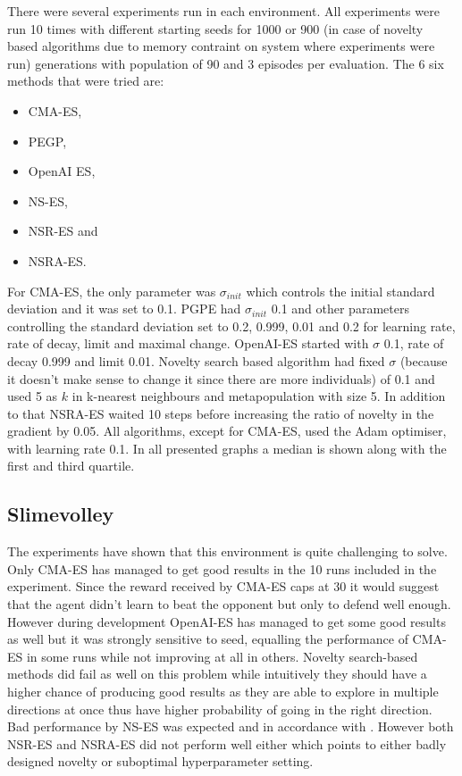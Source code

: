 There were several experiments run in each environment. All experiments were run 10 times with different starting seeds for 1000 or 900 (in case of novelty based algorithms due to memory contraint on system where experiments were run) generations with population of 90 and 3 episodes per evaluation. The 6 six methods that were tried are:
\begin{itemize}
    \item CMA-ES, 
    \item PEGP,
    \item OpenAI ES,
    \item NS-ES, 
    \item NSR-ES and
    \item NSRA-ES.
\end{itemize}

For CMA-ES, the only parameter was $\sigma_{init}$ which controls the initial standard deviation and it was set to 0.1. PGPE had $\sigma_{init}$ 0.1 and other parameters controlling the standard deviation set to 0.2, 0.999, 0.01 and 0.2 for learning rate, rate of decay, limit and maximal change. OpenAI-ES started with $\sigma$ 0.1, rate of decay 0.999 and limit 0.01. Novelty search based algorithm had fixed $\sigma$ (because it doesn't make sense to change it since there are more individuals) of 0.1 and used 5 as $k$ in k-nearest neighbours and metapopulation with size 5. In addition to that NSRA-ES waited 10 steps before increasing the ratio of novelty in the gradient by 0.05. All algorithms, except for CMA-ES, used the Adam \cite{kingma2017adam} optimiser, with learning rate 0.1. In all presented graphs a median is shown along with the first and third quartile.

\subsection{Slimevolley}

The experiments have shown that this environment is quite challenging to solve. Only CMA-ES has managed to get good results in the 10 runs included in the experiment. Since the reward received by CMA-ES caps at 30 it would suggest that the agent didn't learn to beat the opponent but only to defend well enough. However during development OpenAI-ES has managed to get some good results as well but it was strongly sensitive to seed, equalling the performance of CMA-ES in some runs while not improving at all in others. Novelty search-based methods did fail as well on this problem while intuitively they should have a higher chance of producing good results as they are able to explore in multiple directions at once thus have higher probability of going in the right direction. Bad performance by NS-ES was expected and in accordance with \cite{conti2018}. However both NSR-ES and NSRA-ES did not perform well either which points to either badly designed novelty or suboptimal hyperparameter setting. 

